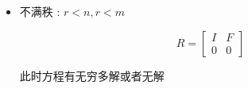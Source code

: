 \documentclass[UTF8,12pt]{ctexbook}
\begin{document}
{{{{{\begin{itemize}
{          此时矩阵可逆并且是个方阵.零空间只有零向量,无论$\vec{b}$取什么值,方程$A\vec{x} = \vec{b}$都有唯一解.
          $$
            \mbox{比如}A = \begin{bmatrix}
              1 & 2 \\
              3 & 1
            \end{bmatrix}
            \to
            \begin{bmatrix}
              1 & 0 \\
              0 & 1
            \end{bmatrix}
            =
            R
            =
            I
          $$
          }
    \item {
          不满秩 : $r < n, r < m$

          $$
            R = \begin{bmatrix}
              I & F \\
              0 & 0
            \end{bmatrix}
          $$

          此时方程有无穷多解或者无解
          }
  \end{itemize}










}}}}}
\end{document}
